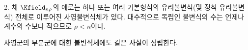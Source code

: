 
2. 체 $\Kfield_{n\rho}$의 예로는 하나 또는 여러 기본형식의 유리불변식(및 정칙 유리불변식) 전체로 이루어진 사영불변식체가 있다. 대수적으로 독립인 불변식의 수는 언제나 계수의 수보다 작으므로 $\rho<n$이다.

사영군의 부분군에 대한 불변식체에도 같은 사실이 성립한다.
